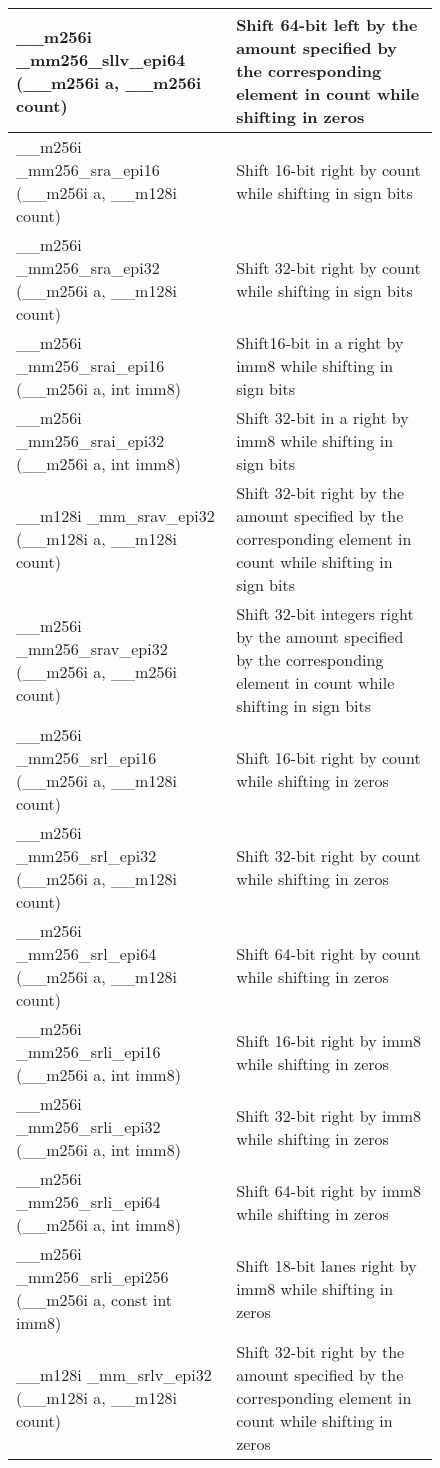 \documentclass{article}
\begin{document}
\begin{figure}[h!]
\begin{tabular}{|l|l|}
  \hline
     \_\_m256i \_mm256\_sllv\_epi64 (\_\_m256i a, \_\_m256i count) & Shift 64-bit left by the amount specified by the corresponding element in count while shifting in zeros\\
  \hline
  \_\_m256i \_mm256\_sra\_epi16 (\_\_m256i a, \_\_m128i count) & 
Shift 16-bit right by count while shifting in sign bits \\
\hline
  \_\_m256i \_mm256\_sra\_epi32 (\_\_m256i a, \_\_m128i count) & 
Shift 32-bit right by count while shifting in sign bits \\
\hline
\_\_m256i \_mm256\_srai\_epi16 (\_\_m256i a, int imm8) & Shift16-bit in a right by imm8 while shifting in sign bits\\
\hline
\_\_m256i \_mm256\_srai\_epi32 (\_\_m256i a, int imm8) & Shift 32-bit in a right by imm8 while shifting in sign bits\\
\hline
\_\_m128i \_mm\_srav\_epi32 (\_\_m128i a, \_\_m128i count) & 
Shift 32-bit right by the amount specified by the corresponding element in count while shifting in sign bits\\
\hline
\_\_m256i \_mm256\_srav\_epi32 (\_\_m256i a, \_\_m256i count) & Shift 32-bit integers right by the amount specified by the corresponding element in count while shifting in sign bits\\
\hline
\_\_m256i \_mm256\_srl\_epi16 (\_\_m256i a, \_\_m128i count) & Shift 16-bit right by count while shifting in zeros\\
\hline
\_\_m256i \_mm256\_srl\_epi32 (\_\_m256i a, \_\_m128i count) & Shift 32-bit right by count while shifting in zeros\\
\hline
\_\_m256i \_mm256\_srl\_epi64 (\_\_m256i a, \_\_m128i count) & Shift 64-bit right by count while shifting in zeros\\
\hline
\_\_m256i \_mm256\_srli\_epi16 (\_\_m256i a, int imm8) & Shift 16-bit right by imm8 while shifting in zeros\\
\hline 
\_\_m256i \_mm256\_srli\_epi32 (\_\_m256i a, int imm8) & Shift 32-bit right by imm8 while shifting in zeros\\
\hline 
\_\_m256i \_mm256\_srli\_epi64 (\_\_m256i a, int imm8) & Shift 64-bit right by imm8 while shifting in zeros\\
\hline 
\_\_m256i \_mm256\_srli\_epi256 (\_\_m256i a, const int imm8) & Shift 18-bit lanes right by imm8 while shifting in zeros\\
\hline 
\_\_m128i \_mm\_srlv\_epi32 (\_\_m128i a, \_\_m128i count) & Shift 32-bit right by the amount specified by the corresponding element in count while shifting in zeros\\

\end{tabular}
\end{figure}
\end{document}
